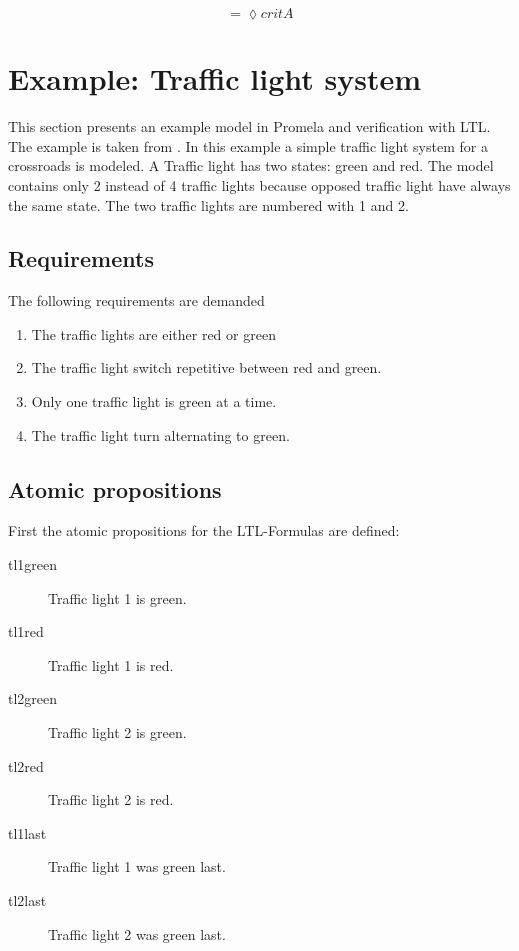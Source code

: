 \documentclass[12pt,a4paper,twoside]{article}
\begin{document}
\[
= \lozenge critA
\]

\section{Example: Traffic light system}
\label{sec:example}

This section presents an example model in Promela and verification with LTL. The example is taken from \cite{kleuker09}. In this example a simple traffic light system for a crossroads is modeled. A Traffic light has two states: green and red. The model contains only 2 instead of 4 traffic lights because opposed traffic light have always the same state. The two traffic lights are numbered with 1 and 2.

\subsection{Requirements}
\label{sec:requirements}

The following requirements are demanded
\begin{enumerate}
\item The traffic lights are either red or green
\item The traffic light switch repetitive between red and green.
\item Only one traffic light is green at a time.
\item The traffic light turn alternating to green.
\end{enumerate}

\subsection{Atomic propositions}
\label{sec:trafficlightap}

First the atomic propositions for the LTL-Formulas are defined:

\begin{description}
\item[tl1green] Traffic light 1 is green.
\item[tl1red] Traffic light 1 is red.
\item[tl2green] Traffic light 2 is green.
\item[tl2red] Traffic light 2 is red.
\item[tl1last] Traffic light 1 was green last.
\item[tl2last] Traffic light 2 was green last.
\end{description}
\end{document}
